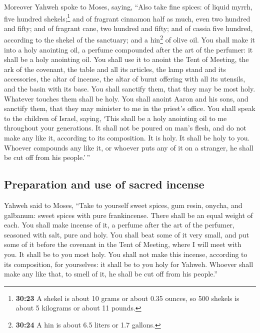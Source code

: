  Moreover Yahweh spoke to Moses, saying, 
``Also take fine spices: of liquid myrrh, five hundred
shekels;\footnote{\textbf{30:23} A shekel is about 10 grams or about
  0.35 ounces, so 500 shekels is about 5 kilograms or about 11 pounds.}
and of fragrant cinnamon half as much, even two hundred and fifty; and
of fragrant cane, two hundred and fifty;  and of cassia
five hundred, according to the shekel of the sanctuary; and a
hin\footnote{\textbf{30:24} A hin is about 6.5 liters or 1.7 gallons.}
of olive oil.  You shall make it into a holy anointing
oil, a perfume compounded after the art of the perfumer: it shall be a
holy anointing oil.  You shall use it to anoint the Tent
of Meeting, the ark of the covenant,  the table and all
its articles, the lamp stand and its accessories, the altar of incense,
 the altar of burnt offering with all its utensils, and
the basin with its base.  You shall sanctify them, that
they may be most holy. Whatever touches them shall be holy.
 You shall anoint Aaron and his sons, and sanctify them,
that they may minister to me in the priest's office.  You
shall speak to the children of Israel, saying, `This shall be a holy
anointing oil to me throughout your generations.  It
shall not be poured on man's flesh, and do not make any like it,
according to its composition. It is holy. It shall be holy to you.
 Whoever compounds any like it, or whoever puts any of it
on a stranger, he shall be cut off from his people.'\,''

\hypertarget{preparation-and-use-of-sacred-incense}{%
\subsection{Preparation and use of sacred
incense}\label{preparation-and-use-of-sacred-incense}}

 Yahweh said to Moses, ``Take to yourself sweet spices,
gum resin, onycha, and galbanum: sweet spices with pure frankincense.
There shall be an equal weight of each.  You shall make
incense of it, a perfume after the art of the perfumer, seasoned with
salt, pure and holy.  You shall beat some of it very
small, and put some of it before the covenant in the Tent of Meeting,
where I will meet with you. It shall be to you most holy.
 You shall not make this incense, according to its
composition, for yourselves: it shall be to you holy for Yahweh.
 Whoever shall make any like that, to smell of it, he
shall be cut off from his people.''

